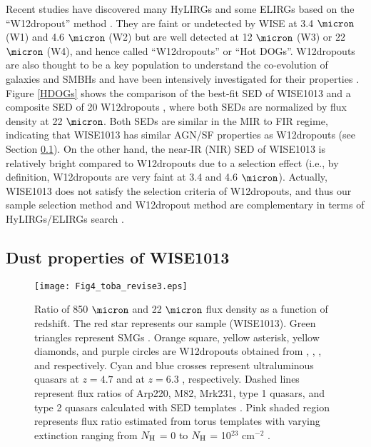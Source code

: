 \documentclass[twocolumn]{aastex6}
\begin{document}
Recent studies have discovered many HyLIRGs and some ELIRGs based on the ``W12dropout'' method \citep{Eisenhardt,Wu}.
They are faint or undetected by WISE at 3.4 $\micron$ (W1) and 4.6 $\micron$ (W2) but are well detected at
12 $\micron$ (W3) or 22 $\micron$ (W4), and hence called ``W12dropouts'' or ``Hot DOGs''.
W12dropouts are also thought to be a key population to understand the co-evolution of galaxies and SMBHs and have been intensively investigated for their properties \citep[e.g.,][]{Assef,Fan_16a,Fan_16b}.
Figure \ref{HDOGs} shows the comparison of the best-fit SED of WISE1013 and a composite SED of 20 W12dropouts \citep{Tsai}, where both SEDs are normalized by flux density at 22 $\micron$.
Both SEDs are similar in the MIR to FIR regime, indicating that WISE1013 has similar AGN/SF properties as W12dropouts (see Section \ref{Dust}).
On the other hand, the near-IR (NIR) SED of WISE1013 is relatively bright compared to W12dropouts due to a selection effect (i.e., by definition, W12dropouts are very faint at 3.4 and 4.6 $\micron$).
Actually, WISE1013 does not satisfy the selection criteria of W12dropouts, and thus our sample selection method and W12dropout method are complementary in terms of HyLIRGs/ELIRGs search \cite[see also][]{Toba_16}.
     
   
\subsection{Dust properties of WISE1013}
\label{Dust}
    \begin{figure*}
   \centering
   \texttt{[image: Fig4\_toba\_revise3.eps]}
   \caption{Ratio of 850 $\micron$ and 22 $\micron$ flux density as a function of redshift. The red star represents our sample (WISE1013). Green triangles represent SMGs \citep{Magnelli}. Orange square, yellow asterisk, yellow diamonds, and purple circles are W12dropouts obtained from \cite{Wu}, \cite{Jones_14}, \cite{Jones_15}, and \cite{Fan_17} respectively. Cyan and blue crosses represent ultraluminous quasars at $z=4.7$ \citep{Leipski} and at $z=6.3$ \citep{XWu,Wang}, respectively. Dashed lines represent flux ratios of Arp220, M82, Mrk231, type 1 quasars, and type 2 quasars calculated with SED templates \citep{Polletta}. Pink shaded region represents flux ratio estimated from torus templates with varying extinction ranging from $N_{\rm H}$ = 0 to $N_{\rm H}$ = 10$^{23}$ cm$^{-2}$ \citep{Silva}.}
   \label{ratio}
   \end{figure*}
         
\end{document}
